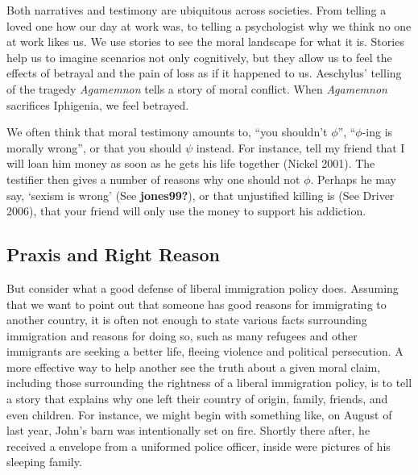 \documentclass[12pt]{book}
\theoremstyle{definition}
\theoremstyle{remark}
\begin{document}
Both narratives and testimony are ubiquitous across societies. From telling a loved one how our day at work was, to telling a psychologist why we think no one at work likes us. We use stories to see the moral landscape for what it is. Stories help us to imagine scenarios not only cognitively, but they allow us to feel the effects of betrayal and the pain of loss as if it happened to us. Aeschylus' telling of the tragedy \emph{Agamemnon} tells a story of moral conflict. When \emph{Agamemnon} sacrifices Iphigenia, we feel betrayed.

We often think that moral testimony amounts to, ``you shouldn't \(\phi\)'', ``\(\phi\)-ing is morally wrong'', or that you should \(\psi\) instead. For instance, tell my friend that I will loan him money as soon as he gets his life together (Nickel 2001). The testifier then gives a number of reasons why one should not \(\phi\). Perhaps he may say, `sexism is wrong' (See \textbf{jones99?}), or that unjustified killing is (See Driver 2006), that your friend will only use the money to support his addiction.

\subsection*{Praxis and Right Reason}\label{praxis-and-right-reason}

But consider what a good defense of liberal immigration policy does. Assuming that we want to point out that someone has good reasons for immigrating to another country, it is often not enough to state various facts surrounding immigration and reasons for doing so, such as many refugees and other immigrants are seeking a better life, fleeing violence and political persecution. A more effective way to help another see the truth about a given moral claim, including those surrounding the rightness of a liberal immigration policy, is to tell a story that explains why one left their country of origin, family, friends, and even children. For instance, we might begin with something like, on August of last year, John's barn was intentionally set on fire. Shortly there after, he received a envelope from a uniformed police officer, inside were pictures of his sleeping family.
\end{document}
